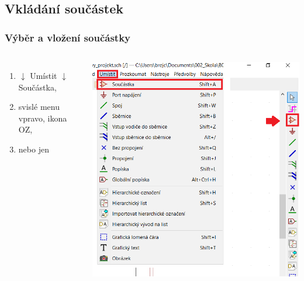 \documentclass{beamer}
\begin{document}


\subsection{\texorpdfstring{Vkládání součástek}{Vkladani soucastek}}
\begin{frame}
	\frametitle{Výběr a vložení součástky}
	\begin{columns}
	
		\small
		\begin{enumerate}
			\item $\downarrow$ Umístit $\downarrow$ Součástka,
			\item svislé menu vpravo, ikona OZ,
			\item {} nebo jen 
		\end{enumerate}
		
		\begin{center}
			\includegraphics[width=\textwidth]{obr/umisti_soucastku01.png}
		\end{center}
		
	\end{columns}
\end{frame}
\end{document}
